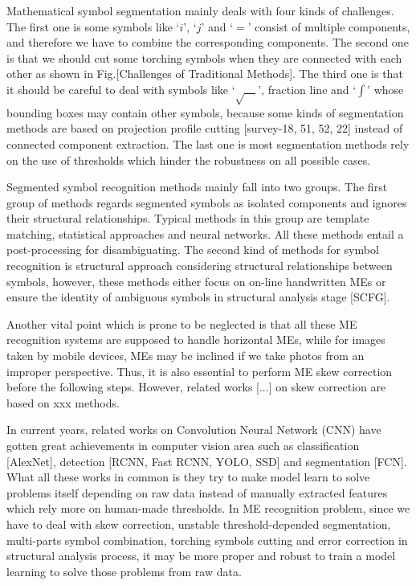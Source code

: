 \documentclass[10pt,conference,a4paper]{IEEEtran}
\begin{document}
	Mathematical symbol segmentation mainly deals with four kinds of challenges. The first one is some symbols like `$i$', `$j$' and `$=$' consist of multiple components, and therefore we have to combine the corresponding components. The second one is that we should cut some torching symbols when they are connected with each other as shown in Fig.[Challenges of Traditional Methods]. The third one is that it should be careful to deal with symbols like `$\sqrt{\quad}$', fraction line and `$\int$' whose bounding boxes may contain other symbols, because some kinds of segmentation methods are based on projection profile cutting [survey-18, 51, 52, 22] instead of connected component extraction. The last one is most segmentation methods rely on the use of thresholds which hinder the robustness on all possible cases. 
	
	Segmented symbol recognition methods mainly fall into two groups. The first group of methods regards segmented symbols as isolated components and ignores their structural relationships. Typical methods in this group are template matching, statistical approaches and neural networks. All these methods entail a post-processing for disambiguating. The second kind of methods for symbol recognition is structural approach considering structural relationships between symbols, however, these methods either focus on on-line handwritten MEs or ensure the identity of ambiguous symbols in structural analysis stage [SCFG].
	
	Another vital point which is prone to be neglected is that all these ME recognition systems are supposed to handle horizontal MEs, while for images taken by mobile devices, MEs may be inclined if we take photos from an improper perspective. Thus, it is also essential to perform ME skew correction before the following steps. However, related works [...] on skew correction are based on xxx methods. %
	
	In current years, related works on Convolution Neural Network (CNN) have gotten great achievements in computer vision area such as classification [AlexNet], detection [RCNN, Fast RCNN, YOLO, SSD] and segmentation [FCN]. What all these works in common is they try to make model learn to solve problems itself depending on raw data instead of manually extracted features which rely more on human-made thresholds. In ME recognition problem, since we have to deal with skew correction, unstable threshold-depended segmentation, multi-parts symbol combination, torching symbols cutting and error correction in structural analysis process, it may be more proper and robust to train a model learning to solve those problems from raw data.
	
\end{document}
